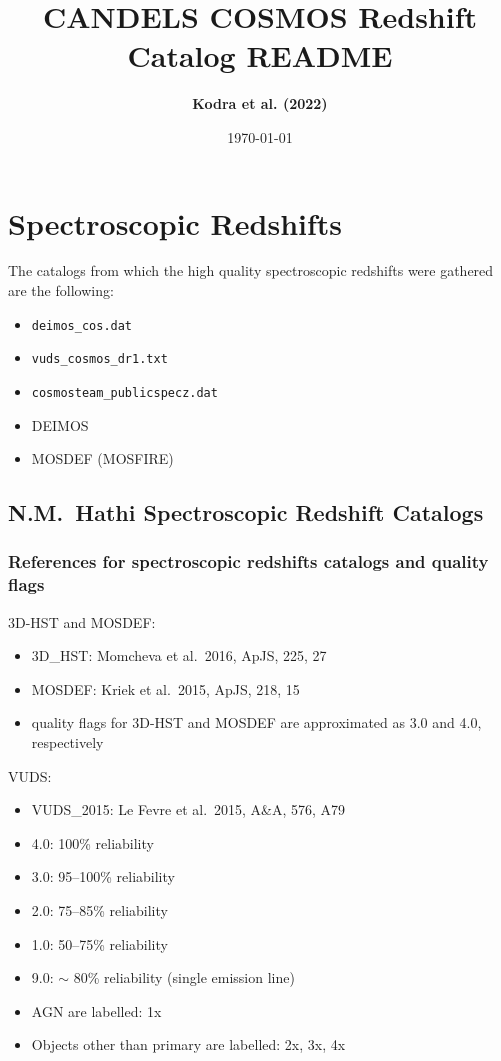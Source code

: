 \documentclass[12pt,onecolumn]{article}
\title{\textbf{CANDELS COSMOS Redshift Catalog README}}
\author{\textbf{Kodra et al. (2022)}}
\date{\today}
\begin{document}
\maketitle





\section*{Spectroscopic Redshifts}

The catalogs from which the high quality spectroscopic redshifts were gathered are the following:
\begin{itemize}
\item \texttt{deimos\_cos.dat}
\item \texttt{vuds\_cosmos\_dr1.txt}
\item \texttt{cosmosteam\_publicspecz.dat}
\item DEIMOS
\item MOSDEF (MOSFIRE)
\end{itemize}

\subsection*{N.M.~Hathi Spectroscopic Redshift Catalogs}
\subsubsection*{References for spectroscopic redshifts catalogs and quality flags}

\noindent 3D-HST and MOSDEF:
\begin{itemize}
\item 3D\_HST: Momcheva et al.\ 2016, ApJS, 225, 27
\item MOSDEF: Kriek et al.\ 2015, ApJS, 218, 15
\item quality flags for 3D-HST and MOSDEF are approximated as 3.0 and 4.0, respectively
\end{itemize}

\noindent VUDS:
\begin{itemize}
\item VUDS\_2015: Le Fevre et al.\ 2015, A\&A, 576, A79
\item 4.0: 100\% reliability
\item 3.0: 95--100\% reliability
\item 2.0: 75--85\% reliability
\item 1.0: 50--75\% reliability
\item 9.0: $\sim$ 80\% reliability (single emission line)
\item AGN are labelled: 1x
\item Objects other than primary are labelled: 2x, 3x, 4x
\end{itemize}
\end{document}
